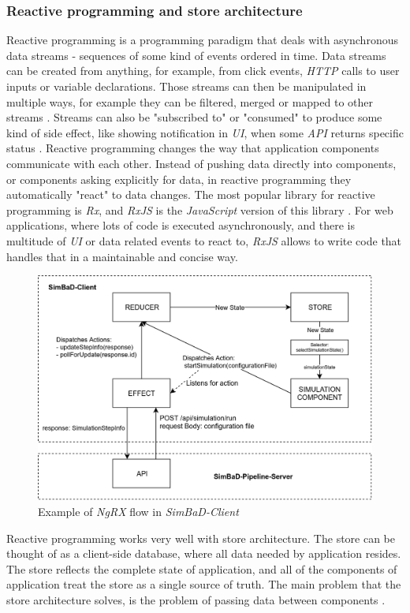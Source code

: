 \subsubsection{Reactive programming and store architecture}
Reactive programming is a programming paradigm that deals with asynchronous data streams - sequences of some kind of events ordered in time. Data streams can be created from anything, for example, from click events, \textit{HTTP} calls to user inputs or variable declarations. Those streams can then be manipulated in multiple ways, for example they can be filtered, merged or mapped to other streams \cite{RxJSOperators}. Streams can also be "subscribed to" or "consumed" to produce some kind of side effect, like showing notification in \textit{UI}, when some \textit{API} returns specific status \cite{RxJSSub}. Reactive programming changes the way that application components communicate with each other. Instead of pushing data directly into components, or components asking explicitly for data, in reactive programming they automatically "react" to data changes. The most popular library for reactive programming is \textit{Rx}, and \textit{RxJS} is the \textit{JavaScript} version of this library \cite{RxJSSource}. For web applications, where lots of code is executed asynchronously, and there is multitude of \textit{UI} or data related events to react to, \textit{RxJS} allows to write code that handles that in a maintainable and concise way.
\begin{figure}[h!]
	\centering
		\includegraphics[width=0.9\linewidth]{diagrams/ngrx.png}
	\caption{Example of \textit{NgRX} flow in \textit{SimBaD-Client}}
	\label{fig:ngrx}
\end{figure}
Reactive programming works very well with store architecture. The store can be thought of as a client-side database, where all data needed by application resides. The store reflects the complete state of application, and all of the components of application treat the store as a single source of truth. The main problem that the store architecture solves, is the problem of passing data between  components \cite{AngularUniWhyStore}.
